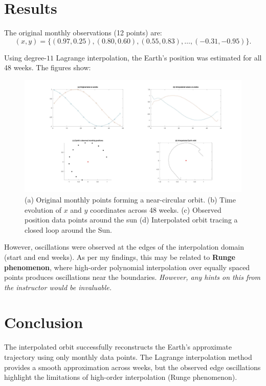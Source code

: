 \section*{Results}
The original monthly observations (12 points) are:
\[
(x,y) = \{(0.97,0.25), (0.80,0.60), (0.55,0.83), \ldots, (-0.31,-0.95)\}.
\]

Using degree-$11$ Lagrange interpolation, the Earth’s position was estimated for all 48 weeks. The figures show:
\begin{figure}[h!]
          \centering
          \includegraphics[width=1.0\textwidth]{a2.jpg}
          \caption{(a) Original monthly points forming a near-circular orbit. (b) Time evolution of $x$ and $y$ coordinates across 48 weeks. (c) Observed position data points around the sun (d) Interpolated orbit tracing a closed loop around the Sun.}
          \label{fig:a2}
\end{figure}

However, oscillations were observed at the edges of the interpolation domain (start and end weeks). As per my findings, this may be related to \textbf{Runge phenomenon}, where high-order polynomial interpolation over equally spaced points produces oscillations near the boundaries. \textit{However, any hints on this from the instructor would be invaluable.}

\section*{Conclusion}
The interpolated orbit successfully reconstructs the Earth’s approximate trajectory using only monthly data points. The Lagrange interpolation method provides a smooth approximation across weeks, but the observed edge oscillations highlight the limitations of high-order interpolation (Runge phenomenon).
